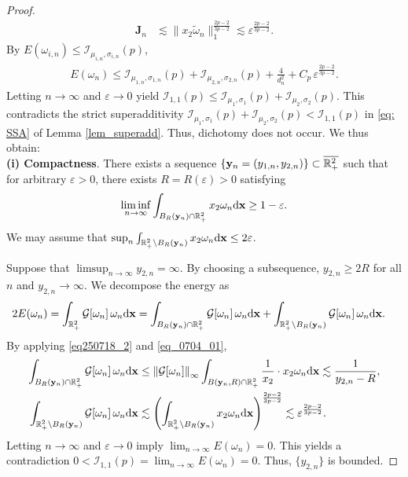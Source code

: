 \documentclass[11pt]{amsart}
\theoremstyle{definition}
\theoremstyle{definition}
\numberwithin{equation}{section}
\newcommand{\tld}[1]{\widetilde{#1}}
\newcommand{\0}{\emptyset}
\newcommand{\omg}{\omega}
\newcommand{\bfx}{{\bf x}}
\newcommand{\bfy}{{\bf y}}
\newcommand{\calG}{\mathcal G}
\newcommand{\calI}{\mathcal I}
\newcommand{\dd}{\mathrm{d}}
\begin{document}
\begin{proof}
				\begin{align*}
					\mathbf{J}_{n}  &\lesssim    \|x_2\tld{\omg}_{n}\|_{1}^{\frac{2p-2}{3p-2}} \lesssim \varepsilon^{\frac{2p-2}{3p-2}}.
				\end{align*}
				By $E(\omega_{i,n})\leq \calI_{\mu_{i,n},\sigma_{i,n}}(p)$, 
				\begin{equation*}
					\label{eq_dicho_1}
					\begin{aligned}
						E(\omega_n)\leq \calI_{\mu_{1,n},\sigma_{1,n}}(p)+\calI_{\mu_{2,n},\sigma_{2,n}}(p)+ \frac{4}{ d_n^{2}} + C_{p}\, \varepsilon^{\frac{2p-2}{3p-2}}.
					\end{aligned}
				\end{equation*}
				Letting $n\to\infty$ and $\varepsilon\to 0$ yield $\calI_{1,1}(p)\leq \calI_{\mu_{1},\sigma_{1}}(p)+\calI_{\mu_{2},\sigma_{2}}(p)$. This contradicts the strict superadditivity $\calI_{\mu_1,\sigma_{1}}(p)+\calI_{\mu_2,\sigma_{2}}(p)<\calI_{1,1}(p)$ in \eqref{eq: SSA} of Lemma \ref{lem_superadd}. Thus, dichotomy does not occur. We thus obtain:  \\
				
				\noindent
				\textbf{(i) Compactness}. There exists a sequence $\{\bfy_n = (y_{1, n}, y_{2, n})\}\subset \overline{\mathbb{R}^{2}_{+}}$ such that for arbitrary $\varepsilon>0$, there exists $R = R(\varepsilon)>0$ satisfying
				\begin{align*}
					\liminf_{n \to \infty} \int_{B_R(\bfy_n)\cap \mathbb{R}^{2}_{+}}x_2\omega_n  \dd \bfx  \geq  1 - \varepsilon.
				\end{align*}
				We may assume that $\sup_{n}\int_{\mathbb{R}^{2}_{+}\backslash B_R(\bfy_n)}x_2\omega_n  \dd \bfx\leq 2\varepsilon$.
				
				Suppose that $\limsup_{n\to\infty} y_{2,n}=\infty$. By choosing a subsequence, $y_{2,n} \ge 2R$ for all $n$ and $y_{2,n} \to \infty$. We decompose the energy as 
				\begin{align*}
					2E(\omega_n)  &=  \int_{\mathbb{R}^{2}_{+}} \calG[\omega_n]\, \omega_n \dd \bfx  =  \int_{B_R(\bfy_n)\cap \mathbb{R}^{2}_{+}} \calG[\omega_n]\, \omega_n   \dd \bfx + \int_{\mathbb{R}^{2}_{+} \setminus B_R(\bfy_n)} \calG[\omega_n] \, \omega_n  \dd \bfx.
				\end{align*}
				By applying \eqref{eq250718_2} and \eqref{eq_0704_01},
				\begin{align*}
					\int_{B_R(\bfy_n)\cap \mathbb{R}^{2}_{+}}\calG[\omega_n] \,\omega_n  \dd \bfx 
					&\leq  \left\|\calG[\omega_n]\right\|_{\infty} \int_{B(\bfy_n,R)\cap \mathbb{R}^{2}_{+}} \frac{1}{x_2} \cdot x_2\omega_n  \dd \bfx \lesssim \frac{1}{y_{2,n} - R}, \\
					\int_{\mathbb{R}^{2}_{+} \setminus B_R(\bfy_n)} \calG[\omega_n] \, \omega_n  \dd \bfx
					&\lesssim   
					\left(\int_{\mathbb{R}^{2}_{+} \setminus B_R(\bfy_n)} x_2 \omega_n  \dd \bfx\right)^{\frac{2p-2}{3p-2}}  \lesssim \varepsilon^{\frac{2p-2}{3p-2}}.
				\end{align*}        
				Letting $n\to\infty$ and $\varepsilon\to 0$ imply $\lim_{n\to\infty}E(\omega_n)= 0$. This yields a  contradiction $0<\calI_{1,1}(p)=\lim_{n\to\infty}E(\omega_n)=0$. Thus, $\{y_{2,n}\}$ is bounded.
				

\end{proof}
\end{document}
